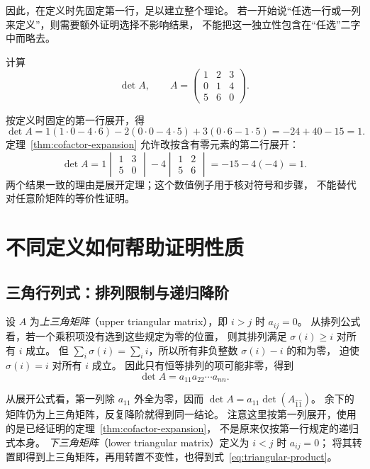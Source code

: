 \documentclass[UTF8,12pt,a4paper,fontset=fandol]{ctexart}
\begin{document}
因此，在定义时先固定第一行，足以建立整个理论。
若一开始说“任选一行或一列来定义”，则需要额外证明选择不影响结果，
不能把这一独立性包含在“任选”二字中而略去。

\begin{example}[不同展开位置给出相同结果]
计算
\[
  \det A,\qquad
  A=\begin{pmatrix}1&2&3\\0&1&4\\5&6&0\end{pmatrix}.
\]
\end{example}

\begin{solve}
按定义时固定的第一行展开，得
\[
  \det A
  =1(1\cdot0-4\cdot6)
   -2(0\cdot0-4\cdot5)
   +3(0\cdot6-1\cdot5)
  =-24+40-15=1.
\]
定理~\ref{thm:cofactor-expansion} 允许改按含有零元素的第二行展开：
\[
  \det A
  =1\begin{vmatrix}1&3\\5&0\end{vmatrix}
   -4\begin{vmatrix}1&2\\5&6\end{vmatrix}
  =-15-4(-4)=1.
\]
两个结果一致的理由是展开定理；这个数值例子用于核对符号和步骤，
不能替代对任意阶矩阵的等价性证明。
\end{solve}

\section{不同定义如何帮助证明性质}
\label{sec:using-definitions}

\subsection{三角行列式：排列限制与递归降阶}

设 $A$ 为\emph{上三角矩阵}（upper triangular matrix），即 $i>j$ 时 $a_{ij}=0$。
从排列公式看，若一个乘积项没有选到这些规定为零的位置，
则其排列满足 $\sigma(i)\geq i$ 对所有 $i$ 成立。
但 $\sum_i\sigma(i)=\sum_i i$，所以所有非负整数 $\sigma(i)-i$ 的和为零，
迫使 $\sigma(i)=i$ 对所有 $i$ 成立。
因此只有恒等排列的项可能非零，得到
\begin{equation}
  \det A=a_{11}a_{22}\cdots a_{nn}.
  \label{eq:triangular-product}
\end{equation}

从展开公式看，第一列除 $a_{11}$ 外全为零，因而
$\det A=a_{11}\det(A_{\widehat1\widehat1})$。
余下的矩阵仍为上三角矩阵，反复降阶就得到同一结论。
注意这里按第一列展开，使用的是已经证明的定理~\ref{thm:cofactor-expansion}，
不是原来仅按第一行规定的递归式本身。
\emph{下三角矩阵}（lower triangular matrix）定义为 $i<j$ 时 $a_{ij}=0$；
将其转置即得到上三角矩阵，再用转置不变性，也得到式~\eqref{eq:triangular-product}。
\end{document}
